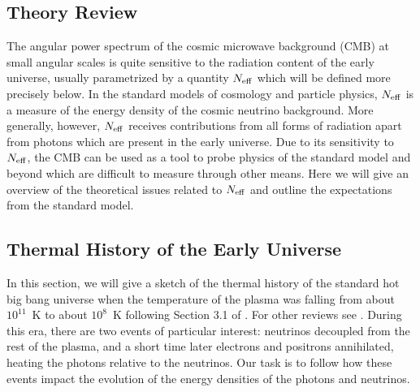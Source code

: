 \subsection{Theory Review}

The angular power spectrum of the cosmic microwave background (CMB) at small angular scales is quite sensitive to the radiation content of the early universe, usually parametrized by a quantity $N_{\rm eff}$ which will be defined more precisely below.  In the standard models of cosmology and particle physics, $N_{\rm eff}$ is a measure of the energy density of the cosmic neutrino background.  More generally, however, $N_{\rm eff}$ receives contributions from all forms of radiation apart from photons which are present in the early universe.  Due to its sensitivity to $N_{\rm eff}$, the CMB can be used as a tool to probe physics of the standard model and beyond which are difficult to measure through other means.  Here we will give an overview of the theoretical issues related to $N_{\rm eff}$ and outline the expectations from the standard model.

\subsection{Thermal History of the Early Universe} \label{ThermalHistory}
In this section, we will give a sketch of the thermal history of the standard hot big bang universe when the temperature of the plasma was falling from about $10^{11}$~K to about $10^8$~K following Section 3.1 of \cite{Weinberg:2008zzc}.  For other reviews see \cite{Dolgov:2002wy,Agashe:2014kda}.  During this era, there are two events of particular interest: neutrinos decoupled from the rest of the plasma, and a short time later electrons and positrons annihilated, heating the photons relative to the neutrinos.  Our task is to follow how these events impact the evolution of the energy densities of the photons and neutrinos.

